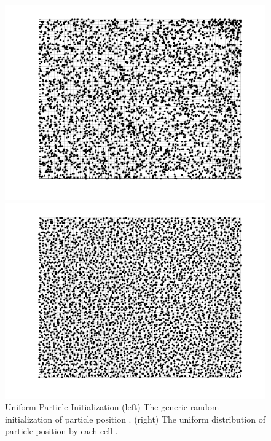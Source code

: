 \begin{figure}
    \centering
  \begin{minipage}[b]{0.49\textwidth}
    \includegraphics[width=\textwidth]{figures/psudo_init.png}
  \end{minipage} %
  \begin{minipage}[b]{0.49\textwidth}
    \includegraphics[width=\textwidth]{figures/uniform_init.png}

  \end{minipage}
  \caption[Uniform Particle Initialization]{Uniform Particle Initialization \textmd{(left) The generic random initialization of particle position \cite{mac_thesis}. (right) The uniform distribution of particle position by each cell \cite{mac_thesis}.}}
  \label{fig:part_init}
\end{figure}

